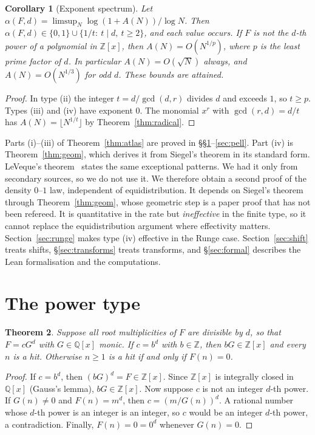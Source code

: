\documentclass[11pt]{amsart}
\newtheorem{theorem}{Theorem}[section]
\newtheorem{corollary}[theorem]{Corollary}
\theoremstyle{definition}
\theoremstyle{remark}
\newcommand{\Z}{\mathbb{Z}}
\newcommand{\Q}{\mathbb{Q}}
\begin{document}
\begin{corollary}[Exponent spectrum]\label{cor:spectrum}
Let $\alpha(F,d)=\limsup_N\log(1+A(N))/\log N$. Then $\alpha(F,d)\in\{0,1\}\cup\{1/t:\ t\mid d,\ t\ge2\}$, and each value occurs. If $F$ is not the $d$-th power of a polynomial in $\Z[x]$, then $A(N)=O(N^{1/p})$, where $p$ is the least prime factor of $d$. In particular $A(N)=O(\sqrt N)$ always, and $A(N)=O(N^{1/3})$ for odd $d$. These bounds are attained.
\end{corollary}

\begin{proof}
In type (ii) the integer $t=d/\gcd(d,r)$ divides $d$ and exceeds $1$, so $t\ge p$. Types (iii) and (iv) have exponent $0$. The monomial $x^r$ with $\gcd(r,d)=d/t$ has $A(N)=\lfloor N^{1/t}\rfloor$ by Theorem~\ref{thm:radical}.
\end{proof}

Parts (i)--(iii) of Theorem~\ref{thm:atlas} are proved in \S\S\ref{sec:power}--\ref{sec:pell}. Part (iv) is Theorem~\ref{thm:geom}, which derives it from Siegel's theorem in its standard form. LeVeque's theorem~\cite{LeVeque} states the same exceptional patterns. We had it only from secondary sources, so we do not use it. We therefore obtain a second proof of the density $0$--$1$ law, independent of equidistribution. It depends on Siegel's theorem through Theorem~\ref{thm:geom}, whose geometric step is a paper proof that has not been refereed. It is quantitative in the rate but \emph{ineffective} in the finite type, so it cannot replace the equidistribution argument where effectivity matters. Section~\ref{sec:runge} makes type (iv) effective in the Runge case. Section~\ref{sec:shift} treats shifts, \S\ref{sec:transforms} treats transforms, and \S\ref{sec:formal} describes the Lean formalisation and the computations.

\section{The power type}\label{sec:power}

\begin{theorem}\label{thm:power}
Suppose all root multiplicities of $F$ are divisible by $d$, so that $F=cG^d$ with $G\in\Q[x]$ monic. If $c=b^d$ with $b\in\Z$, then $bG\in\Z[x]$ and every $n$ is a hit. Otherwise $n\ge1$ is a hit if and only if $F(n)=0$.
\end{theorem}

\begin{proof}
If $c=b^d$, then $(bG)^d=F\in\Z[x]$. Since $\Z[x]$ is integrally closed in $\Q[x]$ (Gauss's lemma), $bG\in\Z[x]$. Now suppose $c$ is not an integer $d$-th power. If $G(n)\ne0$ and $F(n)=m^d$, then $c=(m/G(n))^d$. A rational number whose $d$-th power is an integer is an integer, so $c$ would be an integer $d$-th power, a contradiction. Finally, $F(n)=0=0^d$ whenever $G(n)=0$.
\end{proof}
\end{document}
